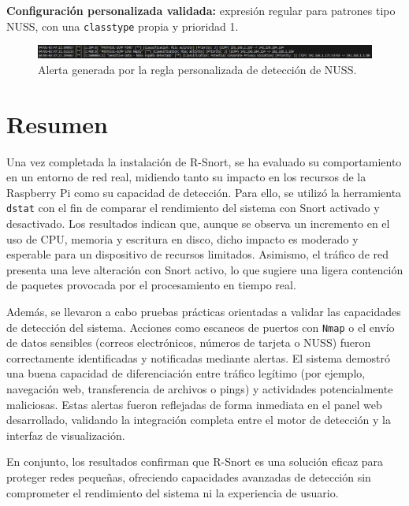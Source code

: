 \documentclass[11pt,a4paper,twoside]{report}
\begin{document}
\textbf{Configuración personalizada validada:} expresión regular para patrones tipo NUSS, con una \texttt{classtype} propia y prioridad 1.

\begin{figure}[H]
	\centering
	\includegraphics[width=\textwidth]{pruebas/6.png}
	\caption{Alerta generada por la regla personalizada de detección de NUSS.}
\end{figure}

\section{Resumen}

Una vez completada la instalación de R-Snort, se ha evaluado su comportamiento en un entorno de red real, midiendo tanto su impacto en los recursos de la Raspberry Pi como su capacidad de detección. Para ello, se utilizó la herramienta \texttt{dstat} con el fin de comparar el rendimiento del sistema con Snort activado y desactivado. Los resultados indican que, aunque se observa un incremento en el uso de CPU, memoria y escritura en disco, dicho impacto es moderado y esperable para un dispositivo de recursos limitados. Asimismo, el tráfico de red presenta una leve alteración con Snort activo, lo que sugiere una ligera contención de paquetes provocada por el procesamiento en tiempo real.\newline

Además, se llevaron a cabo pruebas prácticas orientadas a validar las capacidades de detección del sistema. Acciones como escaneos de puertos con \texttt{Nmap} o el envío de datos sensibles (correos electrónicos, números de tarjeta o NUSS) fueron correctamente identificadas y notificadas mediante alertas. El sistema demostró una buena capacidad de diferenciación entre tráfico legítimo (por ejemplo, navegación web, transferencia de archivos o pings) y actividades potencialmente maliciosas. Estas alertas fueron reflejadas de forma inmediata en el panel web desarrollado, validando la integración completa entre el motor de detección y la interfaz de visualización.\newline

En conjunto, los resultados confirman que R-Snort es una solución eficaz para proteger redes pequeñas, ofreciendo capacidades avanzadas de detección sin comprometer el rendimiento del sistema ni la experiencia de usuario.
\end{document}
